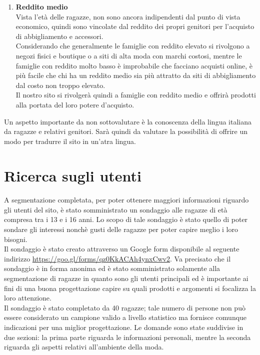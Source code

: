 \documentclass[12pt,a4paper]{report}
\begin{document}
\begin{enumerate}
\begin{enumerate}[label=\alph*.]
   \item \textbf{Reddito medio}\\
   Vista l'età delle ragazze, non sono ancora indipendenti dal punto di vista economico, quindi sono vincolate dal reddito dei propri genitori per l'acquisto di abbigliamento e accessori.\\
   Considerando che generalmente le famiglie con reddito elevato si rivolgono a negozi fisici e boutique o a siti di alta moda con marchi costosi, mentre le famiglie con reddito molto basso è improbabile che facciano acquisti online, è più facile che chi ha un reddito medio sia più attratto da siti di abbigliamento dal costo non troppo elevato.\\
   Il nostro sito si rivolgerà quindi a famiglie con reddito medio e offrirà prodotti alla portata del loro potere d'acquisto.
   \end{enumerate}
 \end{enumerate}
 Un aspetto importante da non sottovalutare è la conoscenza della lingua italiana da ragazze e relativi genitori. Sarà quindi da valutare la possibilità di offrire un modo per tradurre il sito in un'atra lingua.
\section{Ricerca sugli utenti}
\paragraph{}A segmentazione completata, per poter ottenere maggiori informazioni riguardo gli utenti del sito, è stato somministrato un sondaggio alle ragazze di età compresa tra i 13 e i 16 anni. Lo scopo di tale sondaggio è stato quello di poter sondare gli interessi nonchè gusti delle ragazze per poter capire meglio i loro bisogni.\\ Il sondaggio è stato creato attraverso un Google form disponibile al seguente indirizzo \href{run:https://goo.gl/forms/qz0KkACAh4ynxCwv2}{https://goo.gl/forms/qz0KkACAh4ynxCwv2}.
Va precisato che il sondaggio è in forma anonima ed è stato somministrato solamente alla segmentazione di ragazze in quanto sono gli utenti principali ed è importante ai fini di una buona progettazione capire su quali prodotti e argomenti si focalizza la loro attenzione.\\
Il sondaggio è stato completato da 40 ragazze; tale numero di persone non può essere considerato un campione valido a livello statistico ma fornisce comunque indicazioni per una miglior progettazione. Le domande sono state suddivise in due sezioni: la prima parte riguarda le informazioni personali, mentre la seconda riguarda gli aspetti relativi all'ambiente della moda.
\end{document}
